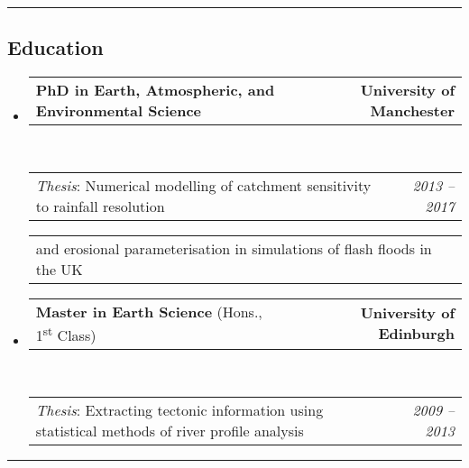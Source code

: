 \documentclass[10.5pt,a4]{article}
\makeatletter
\newcommand{\headerrow}[2]
{\begin{tabular*}{\linewidth}{l@{\extracolsep{\fill}}r}
	#1 &
	#2 \\
\end{tabular*}}
\makeatother
\begin{document}
\hrule
\vspace{-0.4em}
\subsection*{Education}
\begin{itemize}
	\parskip=0.1em
	
	\item 
	\headerrow
		{\textbf{PhD in Earth, Atmospheric, and Environmental Science}}
		{\textbf{University of Manchester}}
	\\
	\headerrow
		{\emph{Thesis}: Numerical modelling of catchment sensitivity to rainfall resolution}
		{\emph{2013 -- 2017}}
	\headerrow
		{\hspace{10mm} and erosional parameterisation in simulations of flash floods in the UK}
		{}
  
	\item 
	\headerrow
		{\textbf{Master in Earth Science} (Hons., 1\textsuperscript{st} Class) }
		{\textbf{University of Edinburgh}}
	\\
	\headerrow
		{\emph{Thesis}: Extracting tectonic information using statistical methods of river profile analysis}
		{\emph{2009 -- 2013}}
\end{itemize}

\hrule
\vspace{-0.4em}
\end{document}
